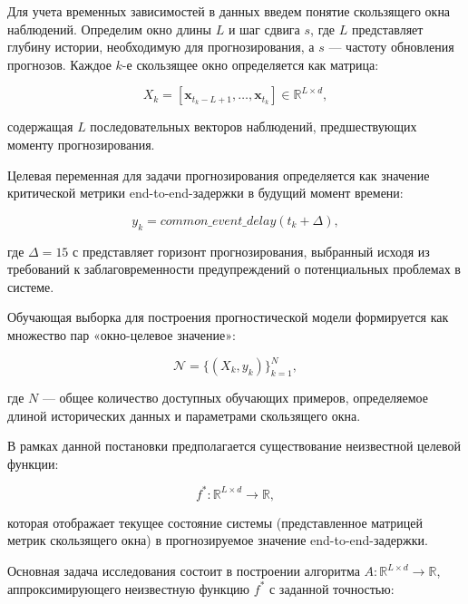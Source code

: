 \hspace*{1.25cm}Для учета временных зависимостей в данных введем понятие скользящего окна наблюдений. Определим окно длины $L$ и шаг сдвига $s$, где $L$ представляет глубину истории, необходимую для прогнозирования, а $s$ --- частоту обновления прогнозов. Каждое $k$-е скользящее окно определяется как матрица:

\begin{equation}
	X_k = [\mathbf{x}_{t_k - L + 1}, \ldots, \mathbf{x}_{t_k}] \in \mathbb{R}^{L \times d},
\end{equation}

содержащая $L$ последовательных векторов наблюдений, предшествующих моменту прогнозирования.

\hspace*{1.25cm}Целевая переменная для задачи прогнозирования определяется как значение критической метрики end-to-end-задержки в будущий момент времени:

\begin{equation}
	y_k = common\_event\_delay(t_k + \Delta),
\end{equation}

где $\Delta = 15$ с представляет горизонт прогнозирования, выбранный исходя из требований к заблаговременности предупреждений о потенциальных проблемах в системе.

\hspace*{1.25cm}Обучающая выборка для построения прогностической модели формируется как множество пар «окно-целевое значение»:

\begin{equation}
	\mathcal{N} = \{(X_k, y_k)\}_{k=1}^{N},
\end{equation}

где $N$ --- общее количество доступных обучающих примеров, определяемое длиной исторических данных и параметрами скользящего окна.

\hspace*{1.25cm}В рамках данной постановки предполагается существование неизвестной целевой функции:

\begin{equation}
	f^*: \mathbb{R}^{L \times d} \to \mathbb{R},
\end{equation}

которая отображает текущее состояние системы (представленное матрицей метрик скользящего окна) в прогнозируемое значение end-to-end-задержки. 

\hspace*{1.25cm}Основная задача исследования состоит в построении алгоритма $A: \mathbb{R}^{L \times d} \to \mathbb{R}$, аппроксимирующего неизвестную функцию $f^*$ с заданной точностью:

